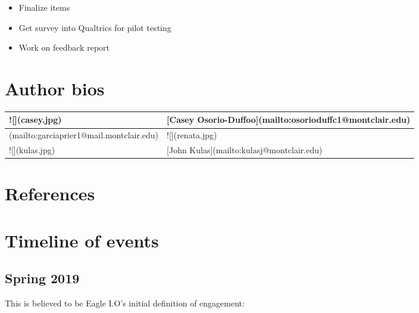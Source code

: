 \documentclass[
]{book}
\providecommand{\tightlist}{%
  \setlength{\itemsep}{0pt}\setlength{\parskip}{0pt}}
\begin{document}
\begin{itemize}
\tightlist
\item
  Finalize items
\item
  Get survey into Qualtrics for pilot testing
\item
  Work on feedback report
\end{itemize}

\hypertarget{author-bios}{%
\chapter{Author bios}\label{author-bios}}

\begin{tabular}{l|l}
\hline
![](casey.jpg) & [Casey Osorio-Duffoo](mailto:osorioduffc1@montclair.edu)\\
\hline
[Renata Garcia Prieto Palacios Roji](mailto:garciaprier1@mail.montclair.edu) & ![](renata.jpg)\\
\hline
![](kulas.jpg) & [John Kulas](mailto:kulasj@montclair.edu)\\
\hline
\end{tabular}

\hypertarget{references}{%
\chapter{References}\label{references}}

\citet{eagly_psychology_1993}
\citeauthor{simpson_engagement_2009} \citetext{\citeyear{simpson_engagement_2009}; \citealp{kahn_psychological_1990}; \citealp{leiter_areas_2003}; \citealp{R-base}; \citealp{R-rmarkdown}; \citealp{rothbard_enriching_2001}; \citealp{saks_antecedents_2006}; \citealp{schaufeli_measurement_2002}; \citealp{simpson_engagement_2009}}

\hypertarget{refs}{}

\hypertarget{appendix-appendices}{%
\appendix}


\hypertarget{timeline-of-events}{%
\chapter{Timeline of events}\label{timeline-of-events}}

\hypertarget{spring-2019}{%
\section{Spring 2019}\label{spring-2019}}

This is believed to be Eagle I.O's initial definition of engagement:
\end{document}
